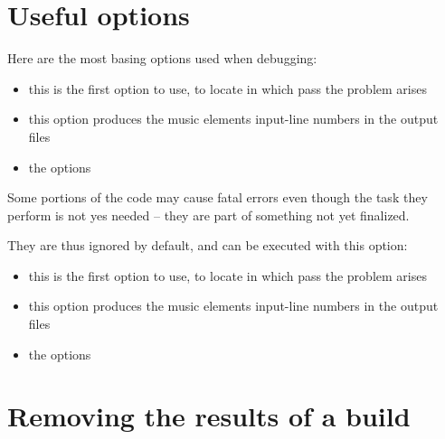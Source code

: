 \section{Useful options}

Here are the most basing options used when debugging:
\begin{itemize}
\item {}
	this is the first option to use, to locate in which pass the problem arises

\item {}
	this option produces the music elements input-line numbers in the output files

\item the  options

\end{itemize}


Some portions of the code may cause fatal errors even though the task they perform is not yes needed -- they are part of something not yet finalized.

They are thus ignored by default, and can be executed with this option:
\begin{itemize}
\item {}
	this is the first option to use, to locate in which pass the problem arises

\item {}
	this option produces the music elements input-line numbers in the output files

\item the  options

\end{itemize}


\section{Removing the results of a build}

